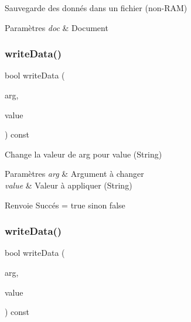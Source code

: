 Sauvegarde des donnés dans un fichier (non-\/\+R\+AM) 


\begin{DoxyParams}{Paramètres}
{\em doc} & Document \\
\hline
\end{DoxyParams}
\mbox{\label{classDataManager_af1b5561cf95f40969d9cb44b0d01a835}} 
\subsubsection{\texorpdfstring{write\+Data()}{writeData()}\hspace{0.1cm}{\footnotesize\ttfamily [1/3]}}
{\footnotesize\ttfamily bool write\+Data (\begin{DoxyParamCaption}\item[{const Q\+String}]{arg,  }\item[{const Q\+String}]{value }\end{DoxyParamCaption}) const\hspace{0.3cm}{\ttfamily [inline]}}



Change la valeur de arg pour value (String) 


\begin{DoxyParams}{Paramètres}
{\em arg} & Argument à changer \\
\hline
{\em value} & Valeur à appliquer (String) \\
\hline
\end{DoxyParams}
\begin{DoxyReturn}{Renvoie}
Succés = true sinon false 
\end{DoxyReturn}
\mbox{\label{classDataManager_a96ac6856ddebd921ac034c3103f1d755}} 
\subsubsection{\texorpdfstring{write\+Data()}{writeData()}\hspace{0.1cm}{\footnotesize\ttfamily [2/3]}}
{\footnotesize\ttfamily bool write\+Data (\begin{DoxyParamCaption}\item[{const Q\+String}]{arg,  }\item[{const int}]{value }\end{DoxyParamCaption}) const\hspace{0.3cm}{\ttfamily [inline]}}



